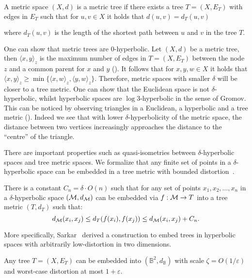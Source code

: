 \begin{definition}
    A metric space $(X,d)$ is a metric tree if there exists a tree $T=(X,E_T)$ with edges in $E_T$ such that for $u,v\in X$ it holds that $d(u,v)=d_T(u,v)$
\end{definition}
where $d_T(u,v)$ is the length of the shortest path between $u$ and $v$ in the tree $T$. 
 


One can show that metric trees are $0$-hyperbolic. Let $(X,d)$ be a metric tree, then $\langle x, y\rangle_z$ is the maximum number of edges in $T=(X,E_T)$ between the node $z$ and a common parent for $x$ and $y$ (). It follows that for $x,y,w\in X$ it holds that $\langle x,y\rangle_z \geq \min\{\langle x,w\rangle_z, \langle y, w\rangle_z\}$. Therefore, metric spaces with smaller $\delta$ will be closer to a tree metric. One can show that the Euclidean space is not $\delta$-hyperbolic, whilst hyperbolic spaces are $\log 3$-hyperbolic in the sense of Gromov. This can be noticed by observing triangles in a Euclidean, a hyperbolic and a tree metric (). Indeed we see that with lower $\delta$-hyperbolicity of the metric space, the distance between two vertices increasingly approaches the distance to the ``centre'' of the triangle.

There are important properties such as quasi-isometries between $\delta$-hyperbolic spaces and tree metric spaces. We formalize that any finite set of points in a $\delta$-hyperbolic space can be embedded in a tree metric with bounded distortion~\cite{gromov1987hyperbolic}.

\begin{proposition}
    There is a constant $C_n =\delta \cdot O(n)$ such that for any set of points $x_1, x_2, \dots,x_n$ in a $\delta$-hyperbolic space $(\mathcal{M},d_{\mathcal{M}})$ can be embedded via $f:\mathcal{M} \to T$ into a tree metric $(T,d_T)$ such that:
    \begin{equation*}
        d_{\mathcal{M}}(x_i, x_j)\leq d_T(f(x_i), f(x_j)) \leq d_{\mathcal{M}}(x_i, x_j) + C_n.
    \end{equation*}
\end{proposition}

More specifically, Sarkar~\cite{sarkar2011lowDIstortionDelaunayEmbedding} derived a construction to embed trees in hyperbolic spaces with arbitrarily low-distortion in two dimensions.

\begin{proposition}[Sarkar]
    Any tree $T=(X,E_T)$ can be embedded into $(\mathbb{B}^2, d_\mathbb{B})$ with scale $\zeta = O(1/\varepsilon)$ and worst-case distortion at most $1 + \varepsilon$.
\end{proposition}

